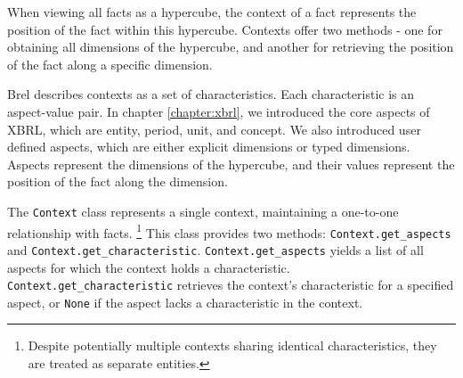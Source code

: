 When viewing all facts as a hypercube, the context of a fact represents the position of the fact within this hypercube.
Contexts offer two methods - 
one for obtaining all dimensions of the hypercube, and another for retrieving the position of the fact along a specific dimension.

Brel describes contexts as a set of characteristics.
Each characteristic is an aspect-value pair.
In chapter \ref{chapter:xbrl}, we introduced the core aspects of XBRL, which are entity, period, unit, and concept.
We also introduced user defined aspects, which are either explicit dimensions or typed dimensions.
Aspects represent the dimensions of the hypercube, and their values represent the position of the fact along the dimension.

The \texttt{Context} class represents a single context,
maintaining a one-to-one relationship with facts.
\footnote{Despite potentially multiple contexts sharing identical characteristics, they are treated as separate entities.}
This class provides two methods: \texttt{Context.get\_aspects} and \texttt{Context.get\_characteristic}.
\texttt{Context.get\_aspects} yields a list of all aspects for which the context holds a characteristic.
\texttt{Context.get\_characteristic} retrieves the context's characteristic for a specified aspect, or \texttt{None} if the aspect lacks a characteristic in the context.


